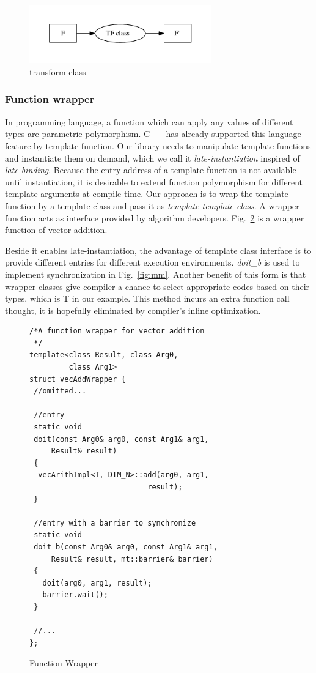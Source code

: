 \documentclass[10pt, conference, compsocconf]{IEEEtran}
\begin{document}
\begin{figure}
\centering
\includegraphics[width=3.1in]{map-class}
\caption{transform class}\label{fig:tfcls}
\end{figure}

\subsubsection{Function wrapper}\label{section:interface}
In programming language, a function which can apply any values of
different types are parametric polymorphism. C++ has already supported
this language feature by template function. Our library needs to
manipulate template functions and instantiate them on demand, which we
call it \emph{late-instantiation} inspired of
\emph{late-binding}. Because the entry address of a template function is not available until instantiation, it is desirable to extend function
polymorphism for different template arguments  at compile-time. Our
approach is to wrap the template function by a template class and pass
it as \emph{template template class}. A wrapper function acts
as interface provided by algorithm developers. Fig.~\ref{lst:wrapper} is a wrapper function of vector addition. 

Beside it enables late-instantiation, the advantage of template class interface
is to provide different entries for different execution environments. \emph{doit\_b} is
used to implement synchronization in Fig.~\ref{fig:mm}.  Another benefit of
this form is that wrapper classes  give compiler a chance to select
appropriate codes based on their types, which is T in our example. This method incurs an extra function call  thought, it is hopefully  eliminated by
compiler's inline optimization.

\begin{figure}[!htp]
\begin{minipage}[tb]{\linewidth}
\makebox[\textwidth]{\hrulefill}
\begin{small}
\begin{verbatim}
/*A function wrapper for vector addition
 */
template<class Result, class Arg0, 
         class Arg1>
struct vecAddWrapper {
 //omitted...
 
 //entry
 static void 
 doit(const Arg0& arg0, const Arg1& arg1, 
     Result& result)
 {
  vecArithImpl<T, DIM_N>::add(arg0, arg1, 
                           result);
 }

 //entry with a barrier to synchronize
 static void 
 doit_b(const Arg0& arg0, const Arg1& arg1, 
     Result& result, mt::barrier& barrier)
 {
   doit(arg0, arg1, result);
   barrier.wait();
 }

 //...
};
\end{verbatim}
\end{small}
\makebox[\textwidth]{\hrulefill}
\end{minipage}
\caption{Function Wrapper}\label{lst:wrapper}
\end{figure}
\end{document}
